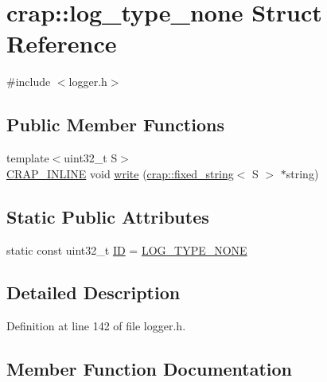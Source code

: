 \hypertarget{structcrap_1_1log__type__none}{}\section{crap\+:\+:log\+\_\+type\+\_\+none Struct Reference}
\label{structcrap_1_1log__type__none}


{\ttfamily \#include $<$logger.\+h$>$}

\subsection*{Public Member Functions}
\begin{DoxyCompactItemize}
\item 
{\footnotesize template$<$uint32\+\_\+t S$>$ }\\\hyperlink{config__x86_8h_a5a40526b8d842e7ff731509998bb0f1c}{C\+R\+A\+P\+\_\+\+I\+N\+L\+I\+N\+E} void \hyperlink{structcrap_1_1log__type__none_a0d844ed1b7b13c7ae0398da665d45919}{write} (\hyperlink{classcrap_1_1fixed__string}{crap\+::fixed\+\_\+string}$<$ S $>$ $\ast$string)
\end{DoxyCompactItemize}
\subsection*{Static Public Attributes}
\begin{DoxyCompactItemize}
\item 
static const uint32\+\_\+t \hyperlink{structcrap_1_1log__type__none_a507790af8e4624f88147ccbc3293407f}{I\+D} = \hyperlink{logger_8h_af309299eede8f70fa53dbabc13c2ad0b}{L\+O\+G\+\_\+\+T\+Y\+P\+E\+\_\+\+N\+O\+N\+E}
\end{DoxyCompactItemize}


\subsection{Detailed Description}


Definition at line 142 of file logger.\+h.



\subsection{Member Function Documentation}
\hypertarget{structcrap_1_1log__type__none_a0d844ed1b7b13c7ae0398da665d45919}{}
